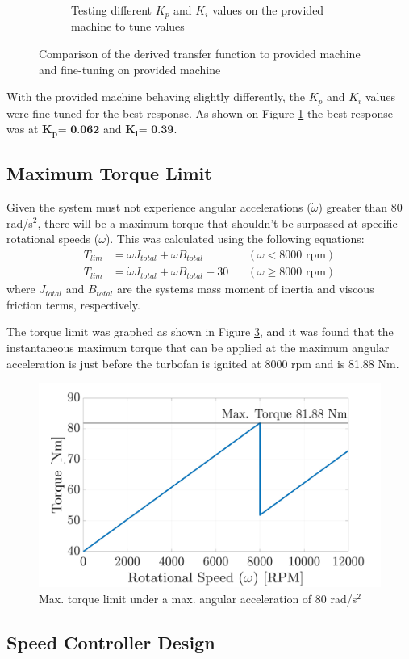 \begin{figure}[tbh!]
\begin{subfigure}{0.54\textwidth}
                 \caption{Testing different \(K_p\) and \(K_i\) values on the provided machine to tune values}
                 \label{fig: settling time test}
             \end{subfigure}
             \caption{Comparison of the derived transfer function to provided machine and fine-tuning on provided machine}
             \label{fig: comparison of current}
        \end{figure}
        With the provided machine behaving slightly differently, the \(K_p\) and \(K_i\) values were fine-tuned for the best response. As shown on Figure \ref{fig: settling time test} the best response was at \(\textbf{K}_\textbf{p} \textbf{= 0.062}\) and \(\textbf{K}_\textbf{i} \textbf{= 0.39}\).

    \subsection{Maximum Torque Limit}
        Given the system must not experience angular accelerations (\(\dot \omega\)) greater than 80 rad/s\(^2\), there will be a maximum torque that shouldn't be surpassed at specific rotational speeds (\(\omega\)). This was calculated using the following equations:
        \begin{align}
            T_{lim} &= \dot \omega J_{total} + \omega B_{total} \:\:\:\: &(\omega < 8000 \text{ rpm}) \\
            T_{lim} &= \dot \omega J_{total} + \omega B_{total} - 30 \:\:\:\: &(\omega \geq 8000 \text{ rpm})
        \end{align}
        where \(J_{total}\) and \(B_{total}\) are the systems mass moment of inertia and viscous friction terms, respectively.

        The torque limit was graphed as shown in Figure \ref{fig: max torque}, and it was found that the instantaneous maximum torque that can be applied at the maximum angular acceleration is just before the turbofan is ignited at 8000 rpm and is 81.88 Nm.
        \begin{figure}[tbh!]
            \centering
            \includegraphics[width=0.6\linewidth]{PEMDT Exam Report/img/max torque.jpg}
            \caption{Max. torque limit under a max. angular acceleration of 80 rad/s\(^2\)}
            \label{fig: max torque}
        \end{figure}

    \subsection{Speed Controller Design}
                